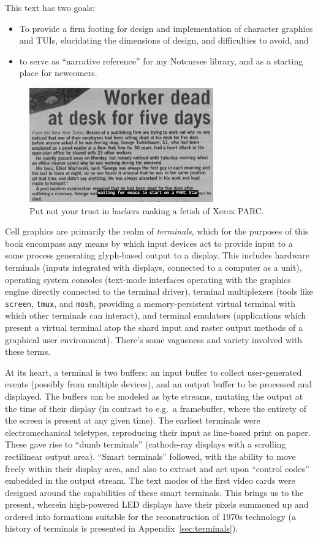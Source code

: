 \documentclass[letterpaper,10pt]{article}
\newenvironment{denseitemize}{
  \begin{itemize}
      \setlength{\itemsep}{0pt}
}{
  \end{itemize}
}
\begin{document}
This text has two goals:
\begin{denseitemize}
\item{To provide a firm footing for design and implementation of character
    graphics and TUIs, elucidating the dimensions of design, and difficulties
    to avoid, and}
\item{to serve as ``narrative reference'' for my Notcurses library, and as
    a starting place for newcomers.}
\end{denseitemize}

\begin{figure}[!htbp]
\centering \includegraphics[width=.5\linewidth]{media/emacs-xerox.jpg}
  \caption{Put not your trust in hackers making a fetish of Xerox PARC.}
  \label{fig:xeroxemacs}
\end{figure}

Cell graphics are primarily the realm of \textit{terminals}, which for the
purposes of this book encompass any means by which input devices act to provide
input to a some process generating glyph-based output to a display. This
includes hardware terminals (inputs integrated with displays, connected to a
computer as a unit), operating system consoles (text-mode interfaces operating
with the graphics engine directly connected to the terminal driver), terminal
multiplexers (tools like \texttt{screen}, \texttt{tmux}, and \texttt{mosh},
providing a memory-persistent virtual terminal with which other terminals can
interact), and terminal emulators (applications which present a virtual
terminal atop the shard input and raster output methods of a graphical user
environment). There's some vagueness and variety involved with these terms.

At its heart, a terminal is two buffers: an input buffer to collect
user-generated events (possibly from multiple devices), and an output buffer to
be processed and displayed. The buffers can be modeled as byte streams, mutating
the output at the time of their display (in contrast to e.g.\ a framebuffer,
where the entirety of the screen is present at any given time). The earliest
terminals were electromechanical teletypes, reproducing their input as
line-based print on paper. These gave rise to ``dumb terminals'' (cathode-ray
displays with a scrolling rectilinear output area). ``Smart terminals'' followed,
with the ability to move freely within their display area, and also to extract
and act upon ``control codes'' embedded in the output stream. The text modes
of the first video cards were designed around the capabilities of these smart
terminals. This brings us to the present, wherein high-powered LED
displays have their pixels summoned up and ordered into formations suitable
for the reconstruction of 1970s technology (a history of terminals is presented
in Appendix~\ref{sec:terminals}).
\end{document}
